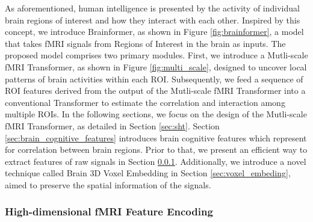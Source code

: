 As aforementioned, human intelligence is presented by the activity of individual brain regions of interest and how they interact with each other. Inspired by this concept, we introduce Brainformer, as shown in Figure \ref{fig:brainformer}, a model that takes fMRI signals from Regions of Interest in the brain as inputs. The proposed model comprises two primary modules. First, we introduce a Mutli-scale fMRI Transformer, as shown in Figure \ref{fig:multi_scale}, designed to uncover local patterns of brain activities within each ROI. Subsequently, we feed a sequence of ROI features derived from the output of the Mutli-scale fMRI Transformer into a conventional Transformer to estimate the correlation and interaction among multiple ROIs. In the following sections, we focus on the design of the Mutli-scale fMRI Transformer, as detailed in Section \ref{sec:sht}. Section \ref{sec:brain_cognitive_features} introduces brain cognitive features which represent for correlation between brain regions. Prior to that, we present an efficient way to extract features of raw signals in Section \ref{sec:fmri_feature}. Additionally, we introduce a novel technique called Brain 3D Voxel Embedding in Section \ref{sec:voxel_embeding}, aimed to preserve the spatial information of the signals.






\subsubsection{High-dimensional fMRI Feature Encoding}
\label{sec:fmri_feature}


